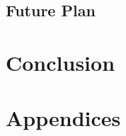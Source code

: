 \documentclass[final-report]{article-template}
\begin{document}
\subsection{Future Plan}



\section{Conclusion}


\newpage



\clearpage
\section*{Appendices}
\appendix
\end{document}
